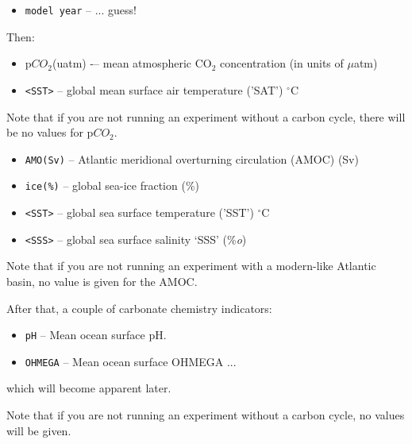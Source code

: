 \vspace{1mm}\begin{itemize}
\item[] \texttt{model year}  -- ... guess!
\end{itemize}\vspace{1mm}

\noindent Then:

\vspace{1mm}\begin{itemize}
\item[] p\(CO_{2}\)(uatm) -– mean atmospheric CO\(_{2}\) concentration (in units of \(\mu\)atm)
\item[] \texttt{<SST>} -- global mean surface air temperature ('SAT') $^{\circ}$C
\end{itemize}\vspace{1mm}

Note that if you are not running an experiment without a carbon cycle, there will be no values for p\(CO_{2}\).

\vspace{1mm}\begin{itemize}
\item[] \texttt{AMO(Sv)} -- Atlantic meridional overturning circulation (AMOC) (Sv)
\item[] \texttt{ice(\%)} -- global sea-ice fraction (\%)
\item[] \texttt{<SST>} -- global sea surface temperature ('SST') $^{\circ}$C
\item[] \texttt{<SSS>} -- global sea surface salinity ‘SSS’ (\%\textit{o})
\end{itemize}\vspace{1mm}

Note that if you are not running an experiment with a modern-like Atlantic basin, no value is given for the AMOC.

\noindent After that, a couple of carbonate chemistry indicators:

\vspace{1mm}\begin{itemize}
\item[] \texttt{pH} -- Mean ocean surface pH.
\item[] \texttt{OHMEGA} -- Mean ocean surface OHMEGA ...
\end{itemize}\vspace{1mm}

\noindent which will become apparent later.

Note that if you are not running an experiment without a carbon cycle, no values will be given.

